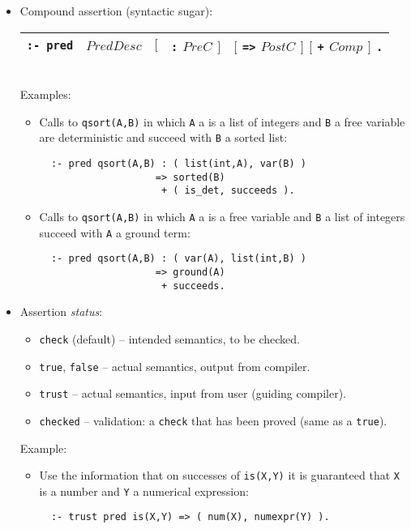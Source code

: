 \documentclass{article}
\renewcommand{\_}{\char'137}
\begin{document}
\begin{itemize}
\item Compound assertion (syntactic sugar):

\begin{tabular}{|lllll|}
\hline
{\tt :- pred}    & $PredDesc$ & $[$ & {\tt :} $PreC$ $]$ & $[$ {\tt =>} $PostC$ $]$ $[$ {\tt +} $Comp$ $]$ {\tt .}\\ [2mm]
\hline
\end{tabular} \\

Examples:
\begin{itemize}
  \item Calls to \verb+qsort(A,B)+ in which \verb+A+ a is a list of
  integers and \verb+B+ a free variable are deterministic and succeed
  with \verb+B+ a sorted list:
 \begin{verbatim}
  :- pred qsort(A,B) : ( list(int,A), var(B) )
                    => sorted(B) 
                     + ( is_det, succeeds ).
\end{verbatim}
  \item Calls to \verb+qsort(A,B)+ in which \verb+A+ a is a free variable
  and \verb+B+ a list of integers succeed with \verb+A+ a ground term:
 \begin{verbatim}
  :- pred qsort(A,B) : ( var(A), list(int,B) )
                    => ground(A) 
                     + succeeds. 
\end{verbatim}
\end{itemize}

\item Assertion {\em status}: 
\begin{itemize}
\item {\tt check} (default) -- intended semantics, to be checked.
\item {\tt true}, {\tt false} -- actual semantics, output from compiler.
\item {\tt trust} -- actual semantics, input from user (guiding compiler).
\item {\tt checked} -- validation: a {\tt check} that has been proved
  (same as a {\tt true}).
\end{itemize}

Example:
\begin{itemize}
\item Use the information that on successes of \verb+is(X,Y)+ it is
  guaranteed that \verb+X+ is a number and \verb+Y+ a numerical expression:
\begin{verbatim}
  :- trust pred is(X,Y) => ( num(X), numexpr(Y) ).
\end{verbatim}
\end{itemize}


\end{itemize}
\end{document}
